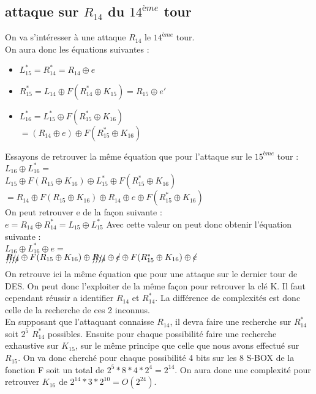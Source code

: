 \documentclass[a4paper,11pt]{article}
\begin{document}
	\subsection{attaque sur $R_{14}$ du $14^{ème}$ tour}
	On va s'intéresser à une attaque $R_{14}$ le $14^{ème}$ tour.\\
	On aura donc les équations suivantes :
	\begin{itemize}
		\item $L_{15}^{*} = R_{14}^{*} = R_{14} \oplus e$
		\item $R_{15}^{*} = L_{14}\oplus F( R_{14}^{*}\oplus K_{15}) = R_{15} \oplus e'$
		\item $L_{16}^{*} = L_{15}^{*}\oplus F( R_{15}^{*}\oplus K_{16})$\\
		$= (R_{14} \oplus e)\oplus  F( R_{15}^{*}\oplus K_{16})$
	\end{itemize}
	Essayons de retrouver la même équation que pour l'attaque sur le $15^{ème}$ tour :\\
	$L_{16} \oplus L_{16}^{*} = $\\ 
	$L_{15}\oplus  F( R_{15}\oplus K_{16})\oplus L_{15}^{*} \oplus F( R_{15}^{*}\oplus K_{16})$\\
	$= R_{14}\oplus  F( R_{15}\oplus K_{16})\oplus  R_{14} \oplus e \oplus F( R_{15}^{*}\oplus K_{16})$\\
	On peut retrouver e de la façon suivante :\\
	$e = R_{14}\oplus R_{14}^{*} = L_{15}\oplus  L_{15}^{*}$
	Avec cette valeur on peut donc obtenir l'équation suivante :\\
	$L_{16} \oplus L_{16}^{*} \oplus e = $\\ 
	$\xout{R_{14}}\oplus  F( R_{15}\oplus K_{16})\oplus  \xout{R_{14}} \oplus \xout{e} \oplus F( R_{15}^{*}\oplus K_{16})\oplus \xout{e}$\\
	On retrouve ici la même équation que pour une attaque sur le dernier tour de DES. On peut donc l'exploiter de la même façon pour retrouver la clé K. Il faut cependant réussir a identifier $R_{14}$ et $R_{14}^{*}$. La différence de complexités est donc celle de la recherche de ces 2 inconnus.\\
	En supposant que l'attaquant connaisse $R_{14}$, il devra faire une recherche sur $R_{14}^{*}$ soit $2^{5}$  $R_{14}^{*}$ possibles. Ensuite pour chaque possibilité faire une recherche exhaustive sur $K_{15}$, sur le même principe que celle que nous avons effectué sur $R_{15}$. On va donc cherché pour chaque possibilité 4 bits sur les 8 S-BOX de la fonction F soit un total de $2^{5}*8*4*2^{4} = 2^{14}$. On aura donc une complexité pour retrouver $K_{16}$ de $2^{14} * 3 * 2^{10} = O(2^{24})$.
\end{document}
